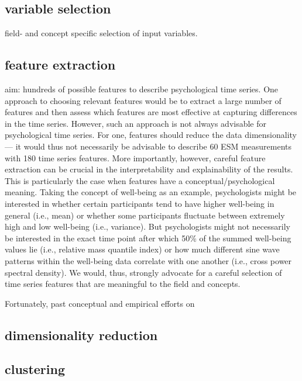 \documentclass[man, 12pt, a4paper]{apa7}
\theoremstyle{break}
\theoremstyle{plain}
\begin{document}
\subsection{variable selection}
field- and concept specific selection of input variables. 

\subsection{feature extraction}
aim: 
hundreds of possible features to describe psychological time series. One approach to choosing relevant features would be to extract a large number of features and then assess which features are most effective at capturing differences in the time series. However, such an approach is not always advisable for psychological time series. For one, features should reduce the data dimensionality --- it would thus not necessarily be advisable to describe 60 ESM measurements with 180 time series features. More importantly, however, careful feature extraction can be crucial in the interpretability and explainability of the results. This is particularly the case when features have a conceptual/psychological meaning. Taking the concept of well-being as an example, psychologists might be interested in whether certain participants tend to have higher well-being in general (i.e., mean) or whether some participants fluctuate between extremely high and low well-being (i.e., variance). But psychologists might not necessarily be interested in the exact time point after which 50\% of the summed well-being values lie (i.e., relative mass quantile index) or how much different sine wave patterns within the well-being data correlate with one another (i.e., cross power spectral density). We would, thus, strongly advocate for a careful selection of time series features that are meaningful to the field and concepts.

Fortunately, past conceptual and empirical efforts on 

\citep[variability, inertia, instability, diversity;][]{dejonckheere2019, kuppens2017}

\subsection{dimensionality reduction}

\subsection{clustering}
\end{document}
